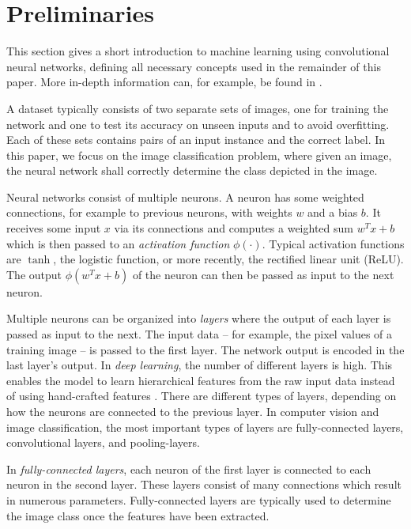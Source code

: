 \documentclass[conference,compsoc,a4paper]{IEEEtran}
\begin{document}

\section{Preliminaries} %
\label{sec:preliminaries}
This section gives a short introduction to machine learning using convolutional neural networks, defining all necessary concepts used in the remainder of this paper.
More in-depth information can, for example, be found in \cite{goodfellow2016-DeepLearningBook}.

A dataset typically consists of two separate sets of images, one for training the network and one to test its accuracy on unseen inputs and to avoid overfitting.
Each of these sets contains pairs of an input instance and the correct label.
In this paper, we focus on the image classification problem, where given an image, the neural network shall correctly determine the class depicted in the image.

Neural networks consist of multiple neurons.
A neuron has some weighted connections, for example to previous neurons, with weights $w$ and a bias $b$.
It receives some input $x$ via its connections and computes a weighted sum $w^Tx+b$ which is then passed to an \emph{activation function} $\phi(\cdot)$.
Typical activation functions are $\tanh$, the logistic function, or more recently, the rectified linear unit (ReLU).
The output $\phi(w^Tx+b)$ of the neuron can then be passed as input to the next neuron.

Multiple neurons can be organized into \emph{layers} where the output of each layer is passed as input to the next.
The input data -- for example, the pixel values of a training image -- is passed to the first layer.
The network output is encoded in the last layer's output.
%
In \emph{deep learning}, the number of different layers is high.
This enables the model to learn hierarchical features from the raw input data instead of using hand-crafted features \cite{chilimbi2014-Project-Adam}.
%
There are different types of layers, depending on how the neurons are connected to the previous layer.
In computer vision and image classification, the most important types of layers are fully-connected layers, convolutional layers, and pooling-layers.

In \emph{fully-connected layers}, each neuron of the first layer is connected to each neuron in the second layer.
These layers consist of many connections which result in numerous parameters.
Fully-connected layers are typically used to determine the image class once the features have been extracted.
\end{document}
